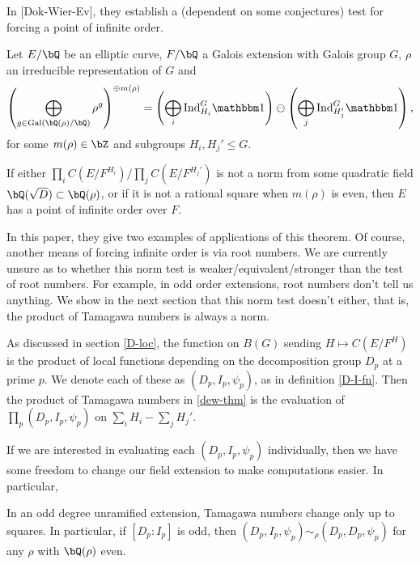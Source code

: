 In [Dok-Wier-Ev], they establish a (dependent on some conjectures) test for forcing a point of infinite order.

\begin{thm}\label{dew-thm}
    Let $E / \bQ$ be an elliptic curve, $F / \bQ$ a Galois extension with Galois group $G$, $\rho$ an irreducible representation of $G$ and 
    \begin{equation}\label{rho-reln}
        \left(\bigoplus_{g \in \Gal(\bQ(\rho) / \bQ)} \rho^g\right)^{\oplus m(\rho)} = 
        \left(\bigoplus_i \Ind_{H_i}^G \trivial \right) \ominus \left(\bigoplus_j \Ind_{H_j'}^G \trivial \right),
    \end{equation}
    for some $m(\rho) \in \bZ$ and subgroups $H_i, H_j' \leq G$. 

    If either $\prod_i C(E / F^{H_i}) / \prod_j  C(E / F^{H_j'})$ is not a norm from some quadratic field $\bQ(\sqrt{D}) \subset \bQ(\rho)$, or if it is not a rational square when $m(\rho)$ is even, then $E$ has a point of infinite order over $F$.
\end{thm}

In this paper, they give two examples of applications of this theorem. Of course, another means of forcing infinite order is via root numbers. We are currently unsure as to whether this norm test is weaker/equivalent/stronger than the test of root numbers. For example, in odd order extensions, root numbers don't tell us anything. We show in the next section that this norm test doesn't either, that is, the product of Tamagawa numbers is always a norm.

\vspace{1em}

As discussed in section \ref{D-loc}, the function on $B(G)$ sending $H \mapsto C(E / F^H)$ is the product of local functions depending on the decomposition group $D_p$ at a prime $p$. We denote each of these as $(D_p, I_p, \psi_p)$, as in definition \ref{D-I-fn}. Then the product of Tamagawa numbers in \ref{dew-thm} is the evaluation of $\prod_p (D_p, I_p, \psi_p)$ on $\sum_i H_i - \sum_j H_j'$.

If we are interested in evaluating each $(D_p, I_p, \psi_p)$ individually, then we have some freedom to change our field extension to make computations easier. In particular, 

\begin{lemma}\label{DeqI}
    In an odd degree unramified extension, Tamagawa numbers change only up to squares. In particular, if $[D_p \colon I_p]$ is odd, then $(D_p, I_p, \psi_p) \sim_{\rho} (D_p, D_p, \psi_p)$ for any $\rho$ with $\bQ(\rho)$ even. 
\end{lemma}


